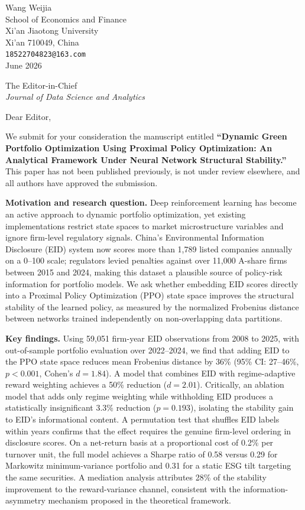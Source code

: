 \documentclass[12pt]{article}
\begin{document}
\begin{flushright}
Wang Weijia\\
School of Economics and Finance\\
Xi'an Jiaotong University\\
Xi'an 710049, China\\
\texttt{18522704823@163.com}\\[6pt]
June 2026
\end{flushright}

\bigskip

The Editor-in-Chief\\
\textit{Journal of Data Science and Analytics}

\bigskip

Dear Editor,

We submit for your consideration the manuscript entitled
\textbf{``Dynamic Green Portfolio Optimization Using Proximal Policy
Optimization: An Analytical Framework Under Neural Network Structural
Stability.''} This paper has not been published previously, is not
under review elsewhere, and all authors have approved the submission.

\textbf{Motivation and research question.}
Deep reinforcement learning has become an active approach to dynamic
portfolio optimization, yet existing implementations restrict state
spaces to market microstructure variables and ignore firm-level
regulatory signals. China's Environmental Information Disclosure (EID)
system now scores more than 1,789 listed companies annually on a 0--100
scale; regulators levied penalties against over 11,000 A-share firms
between 2015 and 2024, making this dataset a plausible source of
policy-risk information for portfolio models. We ask whether embedding
EID scores directly into a Proximal Policy Optimization (PPO) state
space improves the structural stability of the learned policy, as
measured by the normalized Frobenius distance between networks trained
independently on non-overlapping data partitions.

\textbf{Key findings.}
Using 59,051 firm-year EID observations from 2008 to 2025, with
out-of-sample portfolio evaluation over 2022--2024, we find that adding
EID to the PPO state space reduces mean Frobenius distance by 36\%
(95\% CI: 27--46\%, $p<0.001$, Cohen's $d=1.84$). A model that
combines EID with regime-adaptive reward weighting achieves a 50\%
reduction ($d=2.01$). Critically, an ablation model that adds only
regime weighting while withholding EID produces a statistically
insignificant 3.3\% reduction ($p=0.193$), isolating the stability
gain to EID's informational content. A permutation test that shuffles
EID labels within years confirms that the effect requires the genuine
firm-level ordering in disclosure scores. On a net-return basis at a
proportional cost of 0.2\% per turnover unit, the full model achieves a
Sharpe ratio of 0.58 versus 0.29 for Markowitz minimum-variance
portfolio and 0.31 for a static ESG tilt targeting the same securities.
A mediation analysis attributes 28\% of the stability improvement to
the reward-variance channel, consistent with the information-asymmetry
mechanism proposed in the theoretical framework.
\end{document}
